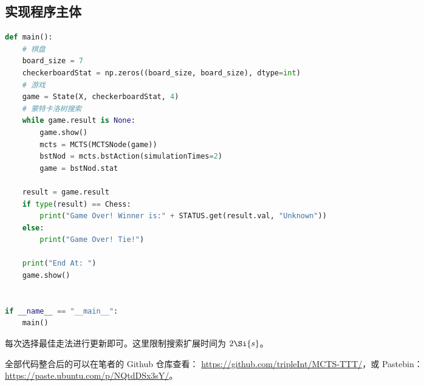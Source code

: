 \subsection{实现程序主体}
\begin{lstlisting}[language=python]
def main():
    # 棋盘
    board_size = 7
    checkerboardStat = np.zeros((board_size, board_size), dtype=int)
    # 游戏
    game = State(X, checkerboardStat, 4)
    # 蒙特卡洛树搜索
    while game.result is None:
        game.show()
        mcts = MCTS(MCTSNode(game))
        bstNod = mcts.bstAction(simulationTimes=2)
        game = bstNod.stat

    result = game.result
    if type(result) == Chess:
        print("Game Over! Winner is:" + STATUS.get(result.val, "Unknown"))
    else:
        print("Game Over! Tie!")

    print("End At: ")
    game.show()


if __name__ == "__main__":
    main()

\end{lstlisting}
每次选择最佳走法进行更新即可。这里限制搜索扩展时间为 $2\Si{s}$。

全部代码整合后的可以在笔者的 Github 仓库查看：
\href{https://github.com/tripleInt/MCTS-TTT/}{https://github.com/tripleInt/MCTS-TTT/}，或 Pastebin：\href{https://paste.ubuntu.com/p/NQtdDSx3sY/}{https://paste.ubuntu.com/p/NQtdDSx3sY/}。